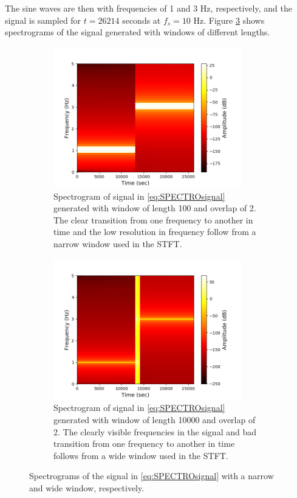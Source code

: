 The sine waves are then with frequencies of 1 and 3 Hz, respectively, and the signal is sampled for $t=26214$ seconds at $f_s=10$ Hz. Figure \ref{fig:test_stft} shows spectrograms of the signal generated with windows of different lengths.
\begin{figure}[H]
\centering
\begin{subfigure}{0.49\textwidth}
\centering
\includegraphics[width=0.9\textwidth]{figures/validation/stft/1.png}
\caption{Spectrogram of signal in \eqref{eq:SPECTROsignal} generated with window of length 100 and overlap of 2. The clear transition from one frequency to another in time and the low resolution in frequency follow from a narrow window used in the STFT.}
\label{fig:test_stft1}
\end{subfigure}
\begin{subfigure}{0.49\textwidth}
\centering
\includegraphics[width=0.9\textwidth]{figures/validation/stft/2.png}
\caption{Spectrogram of signal in \eqref{eq:SPECTROsignal} generated with window of length 10000 and overlap of 2. The clearly visible frequencies in the signal and bad transition from one frequency to another in time follows from a wide window used in the STFT.}
\label{fig:test_stft2}
\end{subfigure}
\caption{Spectrograms of the signal in \eqref{eq:SPECTROsignal} with a narrow and wide window, respectively.}
\label{fig:test_stft}
\end{figure}

